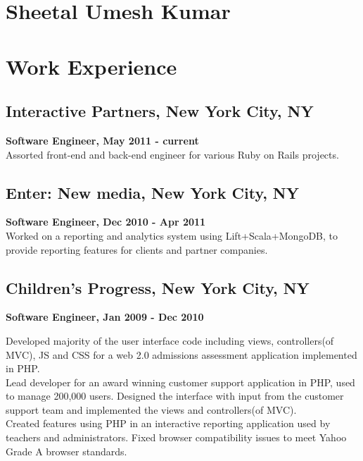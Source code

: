 \documentclass{article}
\begin{document}
\begin{minipage}[t]{3.8in} 
\vspace{-25pt}
\section *{\Huge Sheetal Umesh Kumar} 
\vspace{28pt}
 \section*{Work Experience}   
      \subsection*{Interactive Partners, New York City, NY}
      {\bf Software Engineer, May 2011 - current} \\
      Assorted front-end and back-end engineer for various Ruby on Rails projects.
      
      \subsection*{Enter: New media, New York City, NY}
      {\bf Software Engineer,  Dec 2010 - Apr 2011} \\
      Worked on a reporting and analytics system using Lift+Scala+MongoDB, to provide reporting features for clients and partner companies.
      
      \subsection*{Children's Progress, New York City, NY}
      {\bf Software Engineer, Jan 2009 - Dec 2010} 
      
      Developed majority of the user interface code including views, controllers(of MVC), JS and CSS for a web 2.0 admissions assessment application implemented in PHP. \\
      
      Lead developer for an award winning customer support application in PHP, used to manage 200,000 users. Designed the interface with input from the customer support team and implemented the views and controllers(of MVC). \\
      
      Created features using PHP in an interactive reporting application used by teachers and administrators. Fixed browser compatibility issues to meet Yahoo Grade A browser standards. \\
      

\end{minipage}
\end{document}
